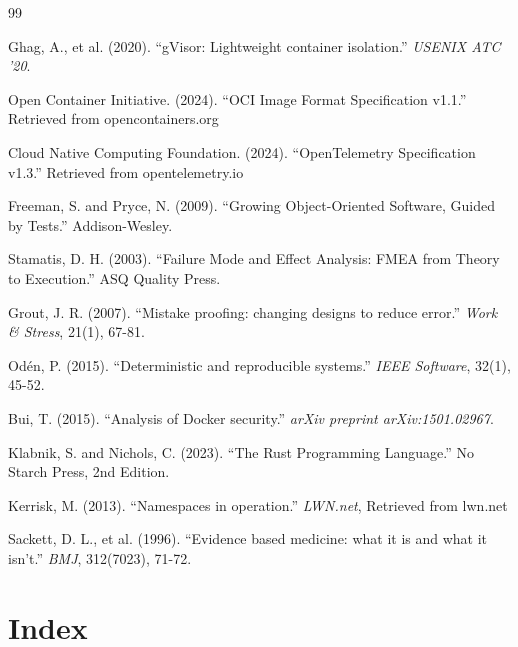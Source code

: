 \documentclass[12pt,twoside,openright]{book}
\theoremstyle{plain}
\theoremstyle{definition}
\theoremstyle{remark}
\begin{document}
\begin{thebibliography}{99}

 Ghag, A., et al. (2020). ``gVisor: Lightweight container isolation.'' \textit{USENIX ATC '20}.

 Open Container Initiative. (2024). ``OCI Image Format Specification v1.1.'' Retrieved from opencontainers.org

 Cloud Native Computing Foundation. (2024). ``OpenTelemetry Specification v1.3.'' Retrieved from opentelemetry.io

 Freeman, S. and Pryce, N. (2009). ``Growing Object-Oriented Software, Guided by Tests.'' Addison-Wesley.

 Stamatis, D. H. (2003). ``Failure Mode and Effect Analysis: FMEA from Theory to Execution.'' ASQ Quality Press.

 Grout, J. R. (2007). ``Mistake proofing: changing designs to reduce error.'' \textit{Work \& Stress}, 21(1), 67-81.

 Odén, P. (2015). ``Deterministic and reproducible systems.'' \textit{IEEE Software}, 32(1), 45-52.

 Bui, T. (2015). ``Analysis of Docker security.'' \textit{arXiv preprint arXiv:1501.02967}.

 Klabnik, S. and Nichols, C. (2023). ``The Rust Programming Language.'' No Starch Press, 2nd Edition.

 Kerrisk, M. (2013). ``Namespaces in operation.'' \textit{LWN.net}, Retrieved from lwn.net

 Sackett, D. L., et al. (1996). ``Evidence based medicine: what it is and what it isn't.'' \textit{BMJ}, 312(7023), 71-72.

\end{thebibliography}

\chapter*{Index}
\end{document}
